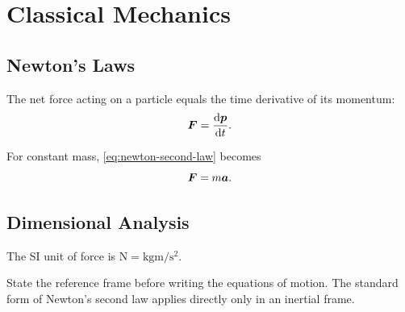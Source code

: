 \documentclass[../main.tex]{subfiles}
\begin{document}
\chapter{Classical Mechanics}
\label{chap:mechanics}

\section{Newton's Laws}

\begin{law}
  The net force acting on a particle equals the time derivative of its
  momentum:
  \begin{equation}
    \bm{F}=\frac{\mathop{}\!\mathrm{d} \bm{p}}{\mathop{}\!\mathrm{d} t}.
    \label{eq:newton-second-law}
  \end{equation}
\end{law}

For constant mass, \cref{eq:newton-second-law} becomes
\begin{equation}
  \bm{F}=m\bm{a}.
\end{equation}

\section{Dimensional Analysis}

The SI unit of force is
$\si{\newton}=\si{\kilogram\metre\per\second\squared}$.

\begin{warningbox}
  State the reference frame before writing the equations of motion. The
  standard form of Newton's second law applies directly only in an inertial
  frame.
\end{warningbox}
\end{document}
